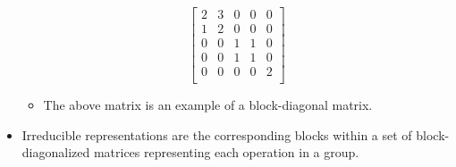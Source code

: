 \documentclass[../notes.tex]{subfiles}
\begin{document}
\begin{itemize}
    \begin{equation*}
        \begin{bmatrix}
            2 & 3 & 0 & 0 & 0\\
            1 & 2 & 0 & 0 & 0\\
            0 & 0 & 1 & 1 & 0\\
            0 & 0 & 1 & 1 & 0\\
            0 & 0 & 0 & 0 & 2\\
        \end{bmatrix}
    \end{equation*}
    \begin{itemize}
        \item The above matrix is an example of a block-diagonal matrix.
    \end{itemize}
    \item Irreducible representations are the corresponding blocks within a set of block-diagonalized matrices representing each operation in a group.
\end{itemize}
\end{document}

